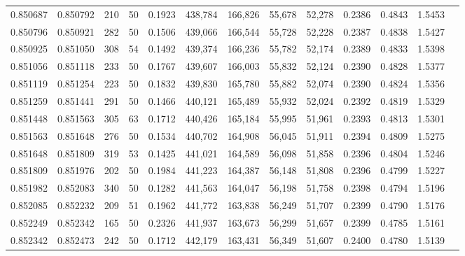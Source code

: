 \begin{tabular}{rrrrrrrrrrrrr}
0.850687 & 0.850792 &   210 &  50 &                                     0.1923 & 438,784 & 166,826 &  55,678 &  52,278 & 0.2386 & 0.4843 & 1.5453 \\
0.850796 & 0.850921 &   282 &  50 &                                     0.1506 & 439,066 & 166,544 &  55,728 &  52,228 & 0.2387 & 0.4838 & 1.5427 \\
0.850925 & 0.851050 &   308 &  54 &                                     0.1492 & 439,374 & 166,236 &  55,782 &  52,174 & 0.2389 & 0.4833 & 1.5398 \\
0.851056 & 0.851118 &   233 &  50 &                                     0.1767 & 439,607 & 166,003 &  55,832 &  52,124 & 0.2390 & 0.4828 & 1.5377 \\
0.851119 & 0.851254 &   223 &  50 &                                     0.1832 & 439,830 & 165,780 &  55,882 &  52,074 & 0.2390 & 0.4824 & 1.5356 \\
0.851259 & 0.851441 &   291 &  50 &                                     0.1466 & 440,121 & 165,489 &  55,932 &  52,024 & 0.2392 & 0.4819 & 1.5329 \\
0.851448 & 0.851563 &   305 &  63 &                                     0.1712 & 440,426 & 165,184 &  55,995 &  51,961 & 0.2393 & 0.4813 & 1.5301 \\
0.851563 & 0.851648 &   276 &  50 &                                     0.1534 & 440,702 & 164,908 &  56,045 &  51,911 & 0.2394 & 0.4809 & 1.5275 \\
0.851648 & 0.851809 &   319 &  53 &                                     0.1425 & 441,021 & 164,589 &  56,098 &  51,858 & 0.2396 & 0.4804 & 1.5246 \\
0.851809 & 0.851976 &   202 &  50 &                                     0.1984 & 441,223 & 164,387 &  56,148 &  51,808 & 0.2396 & 0.4799 & 1.5227 \\
0.851982 & 0.852083 &   340 &  50 &                                     0.1282 & 441,563 & 164,047 &  56,198 &  51,758 & 0.2398 & 0.4794 & 1.5196 \\
0.852085 & 0.852232 &   209 &  51 &                                     0.1962 & 441,772 & 163,838 &  56,249 &  51,707 & 0.2399 & 0.4790 & 1.5176 \\
0.852249 & 0.852342 &   165 &  50 &                                     0.2326 & 441,937 & 163,673 &  56,299 &  51,657 & 0.2399 & 0.4785 & 1.5161 \\
0.852342 & 0.852473 &   242 &  50 &                                     0.1712 & 442,179 & 163,431 &  56,349 &  51,607 & 0.2400 & 0.4780 & 1.5139 \\

\end{tabular}

